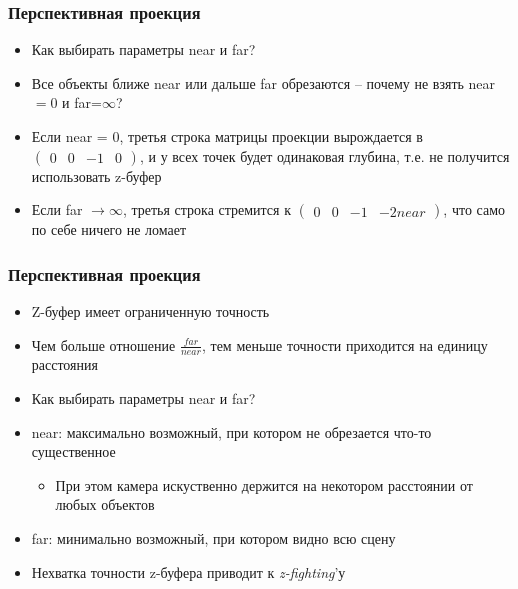 \documentclass[10pt]{beamer}
\begin{document}
\begin{frame}[fragile]
\frametitle{Перспективная проекция}
\begin{itemize}
\item Как выбирать параметры near и far?
\pause
\item Все объекты ближе near или дальше far обрезаются -- почему не взять near\begin{math}= 0\end{math} и far=\begin{math}\infty\end{math}?
\pause
\item Если near = 0, третья строка матрицы проекции вырождается в \begin{math}\begin{pmatrix}0 & 0 & -1 & 0\end{pmatrix}\end{math}, и у всех точек будет одинаковая глубина, т.е. не получится использовать z-буфер
\pause
\item Если far \begin{math}\rightarrow\infty\end{math}, третья строка стремится к \begin{math}\begin{pmatrix}0 & 0 & -1 & -2near\end{pmatrix}\end{math}, что само по себе ничего не ломает
\end{itemize}
\end{frame}

\begin{frame}[fragile]
\frametitle{Перспективная проекция}
\begin{itemize}
\item Z-буфер имеет ограниченную точность
\pause
\item Чем больше отношение \begin{math}\frac{far}{near}\end{math}, тем меньше точности приходится на единицу расстояния
\pause
\item Как выбирать параметры near и far?
\pause
\item near: максимально возможный, при котором не обрезается что-то существенное
\begin{itemize}
\item При этом камера искуственно держится на некотором расстоянии от любых объектов
\end{itemize}
\pause
\item far: минимально возможный, при котором видно всю сцену
\pause
\item Нехватка точности z-буфера приводит к \textit{z-fighting}'у
\end{itemize}
\end{frame}
\end{document}
